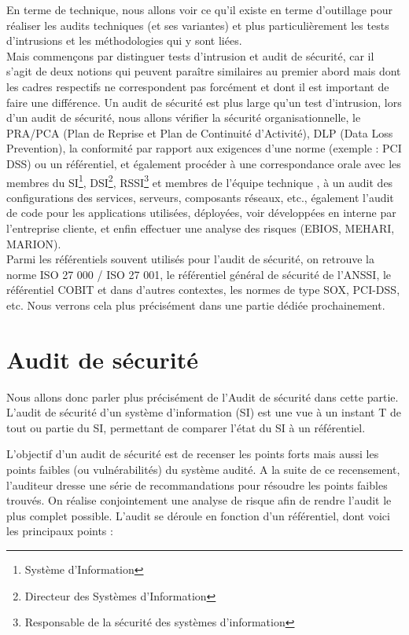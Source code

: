 \documentclass[a4paper]{memoir}
\begin{document}
En terme de technique, nous allons voir ce qu'il existe en terme d'outillage pour réaliser les audits techniques (et ses variantes) et plus particulièrement les tests d'intrusions et les méthodologies qui y sont liées.\\
Mais commençons par distinguer tests d'intrusion et audit de sécurité, car il s'agit de deux notions qui peuvent paraître similaires au premier abord mais dont les cadres respectifs ne correspondent pas forcément et dont il est important de faire une différence. 
Un audit de sécurité est plus large qu'un test d'intrusion, lors d'un audit de sécurité, nous allons vérifier la sécurité organisationnelle, le PRA/PCA (Plan de Reprise et Plan de Continuité d'Activité), DLP (Data Loss Prevention), la conformité par rapport aux exigences d'une norme (exemple : PCI DSS) ou un référentiel, et également procéder à une correspondance orale avec les membres du SI\footnote{Système d'Information}, DSI\footnote{Directeur des Systèmes d'Information}, RSSI\footnote{Responsable de la sécurité des systèmes d'information} et membres de l’équipe technique , à un audit des configurations des services, serveurs, composants réseaux, etc., également l’audit de code pour les applications utilisées, déployées, voir développées en interne par l’entreprise cliente, et enfin effectuer une analyse des risques (EBIOS, MEHARI, MARION).\\ 

Parmi les référentiels souvent utilisés pour l’audit de sécurité, on retrouve la norme ISO 27 000 / ISO 27 001, le référentiel général de sécurité de l’ANSSI, le référentiel COBIT et dans d’autres contextes, les normes de type SOX, PCI-DSS, etc. Nous verrons cela plus précisément dans une partie dédiée prochainement.

\chapter{Audit de sécurité}

Nous allons donc parler plus précisément de l'Audit de sécurité dans cette partie. L'audit de sécurité d'un système d'information (SI) est une vue à un instant T de tout ou partie du SI, permettant de comparer l'état du SI à un référentiel.

L'objectif d'un audit de sécurité est de recenser les points forts mais aussi les points faibles (ou vulnérabilités) du système audité. A la suite de ce recensement, l'auditeur dresse une série de recommandations pour résoudre les points faibles trouvés. On réalise conjointement une analyse de risque afin de rendre l'audit le plus complet possible.
L'audit se déroule en fonction d'un référentiel, dont voici les principaux points :
\end{document}

